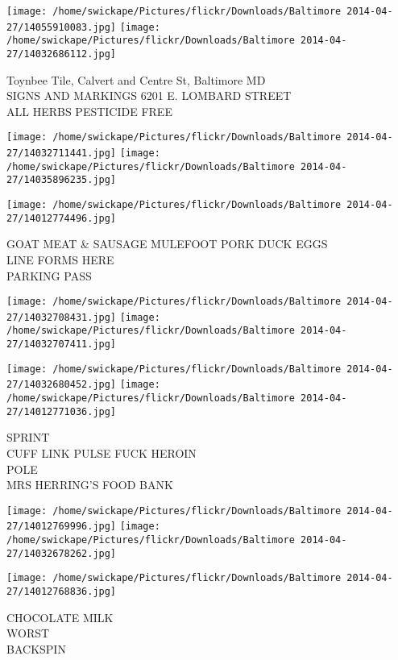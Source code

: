 \documentclass[10pt,letterpaper]{article}
\begin{document}
\vspace{0.25in}
\texttt{[image: /home/swickape/Pictures/flickr/Downloads/Baltimore 2014-04-27/14055910083.jpg]}
\texttt{[image: /home/swickape/Pictures/flickr/Downloads/Baltimore 2014-04-27/14032686112.jpg]}

Toynbee Tile, Calvert and Centre St, Baltimore MD\\
SIGNS AND MARKINGS 6201 E. LOMBARD STREET\\
ALL HERBS PESTICIDE FREE\\
\pagebreak

\texttt{[image: /home/swickape/Pictures/flickr/Downloads/Baltimore 2014-04-27/14032711441.jpg]}
\texttt{[image: /home/swickape/Pictures/flickr/Downloads/Baltimore 2014-04-27/14035896235.jpg]}

\vspace{0.25in}
\texttt{[image: /home/swickape/Pictures/flickr/Downloads/Baltimore 2014-04-27/14012774496.jpg]}

GOAT MEAT \& SAUSAGE MULEFOOT PORK DUCK EGGS\\
LINE FORMS HERE\\
PARKING PASS\\
\pagebreak

\texttt{[image: /home/swickape/Pictures/flickr/Downloads/Baltimore 2014-04-27/14032708431.jpg]}
\texttt{[image: /home/swickape/Pictures/flickr/Downloads/Baltimore 2014-04-27/14032707411.jpg]}

\texttt{[image: /home/swickape/Pictures/flickr/Downloads/Baltimore 2014-04-27/14032680452.jpg]}
\texttt{[image: /home/swickape/Pictures/flickr/Downloads/Baltimore 2014-04-27/14012771036.jpg]}

SPRINT\\
CUFF LINK PULSE FUCK HEROIN\\
POLE\\
MRS HERRING'S FOOD BANK\\
\pagebreak

\texttt{[image: /home/swickape/Pictures/flickr/Downloads/Baltimore 2014-04-27/14012769996.jpg]}
\texttt{[image: /home/swickape/Pictures/flickr/Downloads/Baltimore 2014-04-27/14032678262.jpg]}

\texttt{[image: /home/swickape/Pictures/flickr/Downloads/Baltimore 2014-04-27/14012768836.jpg]}

CHOCOLATE MILK\\
WORST\\
BACKSPIN\\
\pagebreak
\end{document}
